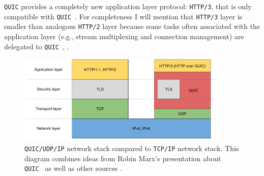 \documentclass[12pt,a4paper]{report}
\begin{document}
\texttt{QUIC} provides a completely new application layer protocol: \texttt{HTTP/3}, that is only compatible with \texttt{QUIC}~\cite{head-of-line-blocking-in-quic-and-http-3-the-details}.
For completeness I will mention that \texttt{HTTP/3} layer is smaller than analogous \texttt{HTTP/2} layer because some tasks often associated with the application layer (e.g., stream multiplexing and connection management) are delegated to \texttt{QUIC}~\cite{bib_grigorik2013}, \cite[Chapter 12]{Google_QUIC_protocol_moving_the_web_from_TCP_to_UDP}.



    \begin{figure}[htbp]
    \centering
    \includegraphics[width=0.9\textwidth]{figs/Layers_in_the_protocol_stack.png}
    \caption[\texttt{QUIC/UDP/IP} network stack compared to \texttt{TCP/IP} network stack]{\texttt{QUIC/UDP/IP} network stack compared to \texttt{TCP/IP} network stack. This diagram combines ideas from Robin Marx's presentation about \texttt{QUIC}~\cite{head-of-line-blocking-in-quic-and-http-3-the-details} as well as other sources \cite{overview_of_the_QUIC_protocol, IETF_presentation_about_QUIC, HTTP_3_the_past_the_present_and_the_future}.
    }
    \label{fig:QUIC_network_stack}
    \end{figure}



%
\end{document}
